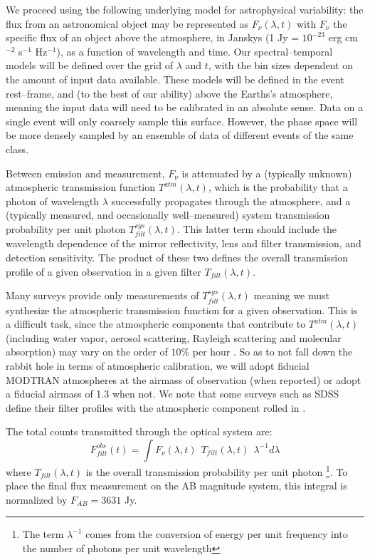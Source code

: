\smallskip

We proceed using the following underlying model for astrophysical variability:
the flux from an astronomical object may be represented as $F_\nu(\lambda, t)$
with $F_\nu$ the specific flux of an object above the atmosphere, in Janskys (1
Jy = $10^{-23}$ erg cm$^{-2}$ s$^{-1}$ Hz$^{-1}$), as a function of wavelength
and time.  Our spectral--temporal models will be defined over the grid of
$\lambda$ and $t$, with the bin sizes dependent on the amount of input data
available.  These models will be defined in the event rest--frame, and (to the
best of our ability) above the Earths's atmosphere, meaning the input data will
need to be calibrated in an absolute sense. Data on a single event will only
coarsely sample this surface.  However, the phase space will be more densely
sampled by an ensemble of data of different events of the same class.

Between emission and measurement, $F_\nu$ is attenuated by a (typically unknown)
atmospheric transmission function $T^{atm}(\lambda, t)$, which is the
probability that a photon of wavelength $\lambda$ successfully propagates
through the atmosphere, and a (typically measured, and occasionally
well--measured) system transmission probability per unit photon
$T^{sys}_{filt}(\lambda, t)$.  This latter term should include the wavelength
dependence of the mirror reflectivity, lens and filter transmission, and
detection sensitivity.  The product of these two defines the overall
transmission profile of a given observation in a given filter $T_{filt}(\lambda,
t)$.

Many surveys provide only measurements of $T^{sys}_{filt}(\lambda, t)$
\citep[e.g.][]{2006ApJ...646.1436S} meaning we must synthesize the atmospheric
transmission function for a given observation.  This is a difficult task, since
the atmospheric components that contribute to $T^{atm}(\lambda, t)$ (including
water vapor, aerosol scattering, Rayleigh scattering and molecular absorption)
may vary on the order of $10\%$ per hour \citep{2007PASP..119.1163S}.  So as to
not fall down the rabbit hole in terms of atmospheric calibration, we will adopt
fiducial MODTRAN atmospheres \citep{1999SPIE.3756..348B} at the airmass of
observation (when reported) or adopt a fiducial airmass of 1.3 when not.  We
note that some surveys such as SDSS define their filter profiles with the
atmospheric component rolled in \citep{2007AJ....134..973I}.

The total counts transmitted through the optical system are: $$F^{obs}_{filt}
(t) = \int F_\nu(\lambda, t) ~~ T_{filt} (\lambda, t) ~~ \lambda^{-1} d\lambda$$
where $T_{filt}(\lambda, t)$ is the overall transmission probability per unit
photon \footnote{The term $\lambda^{-1}$ comes from the conversion of energy per
unit frequency into the number of photons per unit wavelength}. To place the
final flux measurement on the AB magnitude system, this integral is normalized
by $F_{AB} = 3631$ Jy.


